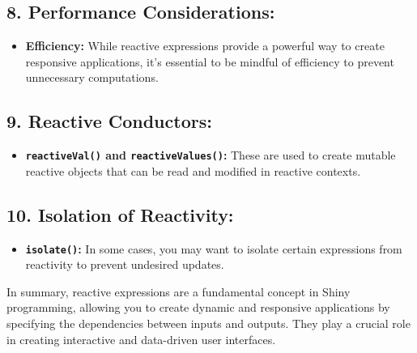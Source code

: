 \documentclass[
]{book}
\newenvironment{Shaded}{\begin{snugshade}}{\end{snugshade}}
\newcommand{\FunctionTok}[1]{\textcolor[rgb]{0.13,0.29,0.53}{\textbf{#1}}}
\newcommand{\NormalTok}[1]{#1}
\newcommand{\OtherTok}[1]{\textcolor[rgb]{0.56,0.35,0.01}{#1}}
\newcommand{\SpecialCharTok}[1]{\textcolor[rgb]{0.81,0.36,0.00}{\textbf{#1}}}
\providecommand{\tightlist}{%
  \setlength{\itemsep}{0pt}\setlength{\parskip}{0pt}}
\begin{document}
\hypertarget{performance-considerations}{%
\subsection{\texorpdfstring{8. \textbf{Performance Considerations:}}{8. Performance Considerations:}}\label{performance-considerations}}

\begin{itemize}
\tightlist
\item
  \textbf{Efficiency:} While reactive expressions provide a powerful way to create responsive applications, it's essential to be mindful of efficiency to prevent unnecessary computations.
\end{itemize}

\hypertarget{reactive-conductors}{%
\subsection{\texorpdfstring{9. \textbf{Reactive Conductors:}}{9. Reactive Conductors:}}\label{reactive-conductors}}

\begin{itemize}
\tightlist
\item
  \textbf{\texttt{reactiveVal()} and \texttt{reactiveValues()}:} These are used to create mutable reactive objects that can be read and modified in reactive contexts.
\end{itemize}

\hypertarget{isolation-of-reactivity}{%
\subsection{\texorpdfstring{10. \textbf{Isolation of Reactivity:}}{10. Isolation of Reactivity:}}\label{isolation-of-reactivity}}

\begin{itemize}
\tightlist
\item
  \textbf{\texttt{isolate()}:} In some cases, you may want to isolate certain expressions from reactivity to prevent undesired updates.
\end{itemize}

\begin{Shaded}
\end{Shaded}

In summary, reactive expressions are a fundamental concept in Shiny programming, allowing you to create dynamic and responsive applications by specifying the dependencies between inputs and outputs. They play a crucial role in creating interactive and data-driven user interfaces.

  
\end{document}
